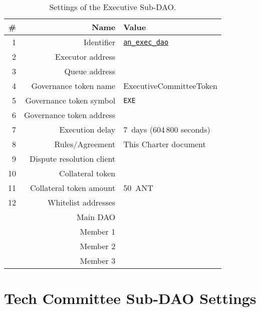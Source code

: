 \begin{table}[h!]
	\caption{Settings of the Executive Sub-DAO.}
	\centering
	\begin{tabular}{rrl}
		\toprule
		\# & Name & Value \\
		\midrule
		 1 & Identifier					& \href{https://govern.aragon.org/\#/daos/an_exec_dao}{\texttt{an\_exec\_dao}}\\
		 2 & Executor address			& \execSubDaoAddr\\
		 3 & Queue address				& \execSubDaoQueueAddr\\
		 4 & Governance token name		& ExecutiveCommitteeToken\\
		 5 & Governance token symbol	& \texttt{EXE}\\
		 6 & Governance token address	& \execSubDaoTokenAddr\\
		 7 & Execution delay			& 7~days (604\,800 seconds)\\
		 8 & Rules/Agreement			& This Charter document\\
		 9 & Dispute resolution client	& \aragonCourtAddr\\
		10 & Collateral token			& \antTokenAddr\\
		11 & Collateral token amount	& 50~\ac{ANT}\\
		12 & Whitelist addresses 		& \\
			& Main \ac{DAO}				& \mainDaoAddr\\
			& Member 1 					& \execSubDaoMemberAddrI\\
			& Member 2 					& \execSubDaoMemberAddrII\\
			& Member 3 					& \execSubDaoMemberAddrIII\\
		\bottomrule
	\end{tabular}
\end{table}

\section{Tech Committee Sub-DAO Settings}

